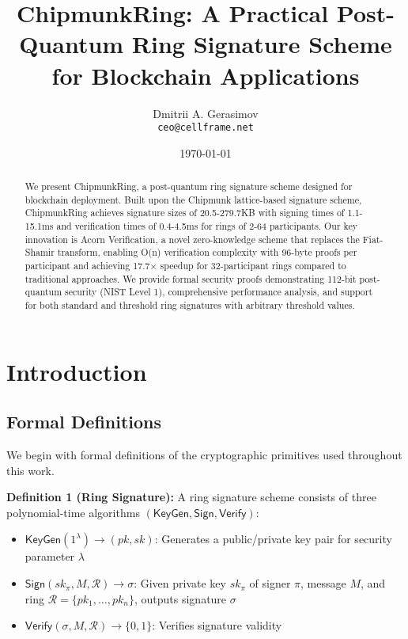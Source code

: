 \documentclass[11pt,a4paper]{article}
\title{ChipmunkRing: A Practical Post-Quantum Ring Signature Scheme for Blockchain Applications}
\author{
Dmitrii A. Gerasimov\\
\texttt{ceo@cellframe.net}
}
\date{\today}
\begin{document}
\maketitle

\begin{abstract}
We present ChipmunkRing, a post-quantum ring signature scheme designed for blockchain deployment. Built upon the Chipmunk lattice-based signature scheme, ChipmunkRing achieves signature sizes of 20.5-279.7KB with signing times of 1.1-15.1ms and verification times of 0.4-4.5ms for rings of 2-64 participants. Our key innovation is Acorn Verification, a novel zero-knowledge scheme that replaces the Fiat-Shamir transform, enabling O(n) verification complexity with 96-byte proofs per participant and achieving 17.7× speedup for 32-participant rings compared to traditional approaches. We provide formal security proofs demonstrating 112-bit post-quantum security (NIST Level 1), comprehensive performance analysis, and support for both standard and threshold ring signatures with arbitrary threshold values.
\end{abstract}

\section{Introduction}

\subsection{Formal Definitions}

We begin with formal definitions of the cryptographic primitives used throughout this work.

\textbf{Definition 1 (Ring Signature):} A ring signature scheme consists of three polynomial-time algorithms $(\mathsf{KeyGen}, \mathsf{Sign}, \mathsf{Verify})$:
\begin{itemize}
\item $\mathsf{KeyGen}(1^\lambda) \rightarrow (pk, sk)$: Generates a public/private key pair for security parameter $\lambda$
\item $\mathsf{Sign}(sk_\pi, M, \mathcal{R}) \rightarrow \sigma$: Given private key $sk_\pi$ of signer $\pi$, message $M$, and ring $\mathcal{R} = \{pk_1, \ldots, pk_n\}$, outputs signature $\sigma$
\item $\mathsf{Verify}(\sigma, M, \mathcal{R}) \rightarrow \{0,1\}$: Verifies signature validity
\end{itemize}
\end{document}
